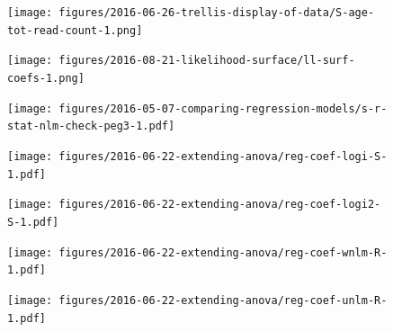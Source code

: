 \documentclass[letterpaper]{article}
\begin{document}
\begin{figure}
\begin{center}
\texttt{[image: figures/2016-06-26-trellis-display-of-data/S-age-tot-read-count-1.png]}
\end{center}
\caption{}
\label{fig:weight-of-evidence}
\end{figure}

\begin{figure}
\begin{center}
\texttt{[image: figures/2016-08-21-likelihood-surface/ll-surf-coefs-1.png]}
\end{center}
\caption{}
\label{fig:likelihood-surface}
\end{figure}

\begin{figure}
\begin{center}
\texttt{[image: figures/2016-05-07-comparing-regression-models/s-r-stat-nlm-check-peg3-1.pdf]}
\end{center}
\caption{}
\label{fig:non-constant-variance}
\end{figure}

\begin{figure}
\begin{center}
\texttt{[image: figures/2016-06-22-extending-anova/reg-coef-logi-S-1.pdf]}
\end{center}
\caption{}
\label{fig:all-effects-logi.S}
\end{figure}

\begin{figure}
\begin{center}
\texttt{[image: figures/2016-06-22-extending-anova/reg-coef-logi2-S-1.pdf]}
\end{center}
\caption{}
\label{fig:all-effects-logi2.S}
\end{figure}

\begin{figure}
\begin{center}
\texttt{[image: figures/2016-06-22-extending-anova/reg-coef-wnlm-R-1.pdf]}
\end{center}
\caption{}
\label{fig:all-effects-wnlm.R}
\end{figure}

\begin{figure}
\begin{center}
\texttt{[image: figures/2016-06-22-extending-anova/reg-coef-unlm-R-1.pdf]}
\end{center}
\caption{}
\label{fig:all-effects-unlm.R}
\end{figure}
\end{document}
